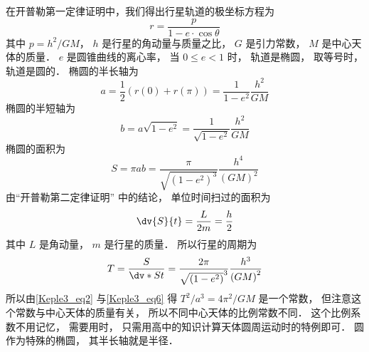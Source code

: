 

在开普勒第一定律证明中，我们得出行星轨道的极坐标方程为
\begin{equation}\label{Keple3_eq1}
  r = \frac{p}{{1 - e \cdot \cos \theta }}
\end{equation}
其中 $p = {h^2}/{GM}$，  $h$ 是行星的角动量与质量之比， $G$ 是引力常数， $M$ 是中心天体的质量． $e$ 是圆锥曲线的离心率， 当 $0 \le e < 1$ 时， 轨道是椭圆， 取等号时， 轨道是圆的． 椭圆的半长轴为
\begin{equation}\label{Keple3_eq2}
  a = \frac{1}{2}\left( {r\left( 0 \right) + r\left( \pi  \right)} \right) = \frac{1}{{1 - {e^2}}}\frac{{{h^2}}}{{GM}}
\end{equation}
椭圆的半短轴为
\begin{equation}\label{Keple3_eq3}
  b = a\sqrt {1 - {e^2}}  = \frac{1}{{\sqrt {1 - {e^2}} }}\frac{{{h^2}}}{{GM}}
\end{equation}
椭圆的面积为
\begin{equation}\label{Keple3_eq4}
  S = \pi ab = \frac{\pi }{\sqrt{\left(1 - e^2\right)^3} }\frac{h^4}{\left( GM \right)^2}
\end{equation}
由“开普勒第二定律证明” 中的结论， 单位时间扫过的面积为
\begin{equation}\label{Keple3_eq5}
\dv{S}{t} = \frac{L}{2m} = \frac{h}{2}
\end{equation}
其中 $L$ 是角动量， $m$ 是行星的质量． 所以行星的周期为
\begin{equation}\label{Keple3_eq6}
  T = \frac{S}{\dv*{S}{t}} = \frac{2\pi}{\sqrt{\left(1 - e^2 \right)}^3}\frac{h^3}{\left(GM\right)^2}
\end{equation}
所以由\autoref{Keple3_eq2} 与\autoref{Keple3_eq6} 得 $T^2/a^3 = 4\pi ^2/GM$ 是一个常数， 但注意这个常数与中心天体的质量有关， 所以不同中心天体的比例常数不同． 这个比例系数不用记忆， 需要用时， 只需用高中的知识计算天体圆周运动时的特例即可． 圆作为特殊的椭圆， 其半长轴就是半径．
